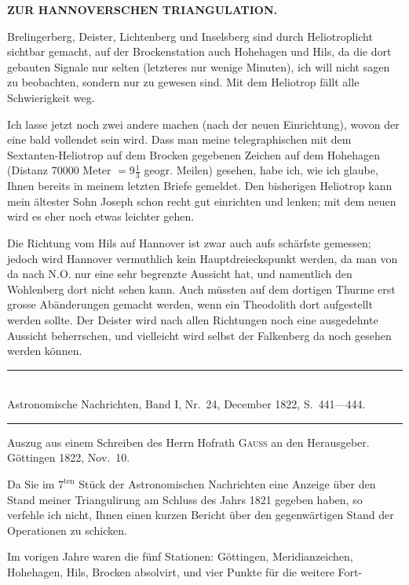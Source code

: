 \par\clearpage
\noindent\null\hfill{\small\textbf{ZUR HANNOVERSCHEN TRIANGULATION.}}\hfill{}\par\medskip
\par\noindent\hspace*{\parindent}Brelingerberg, Deister, Lichtenberg und Inselsberg sind durch Heliotroplicht sichtbar gemacht, auf der Brockenstation auch Hohehagen und Hils, da die dort gebauten Signale nur selten (letzteres nur wenige Minuten), ich will nicht sagen zu beobachten, sondern nur zu  gewesen sind. Mit dem Heliotrop fällt alle Schwierigkeit weg.
\par\noindent\hspace*{\parindent}Ich lasse jetzt noch zwei andere machen (nach der neuen Einrichtung), wovon der eine bald vollendet sein wird. Dass man meine telegraphischen mit dem Sextanten-Heliotrop auf dem Brocken gegebenen Zeichen auf dem Hohehagen (Distanz \(70000\) Meter \(=9\frac{1}{3}\) geogr. Meilen)  gesehen, habe ich, wie ich glaube, Ihnen bereits in meinem letzten Briefe gemeldet. Den bisherigen Heliotrop kann mein ältester Sohn Joseph schon recht gut einrichten und lenken; mit dem neuen wird es eher noch etwas leichter gehen.
\par\noindent\hspace*{\parindent}Die Richtung vom Hils auf Hannover ist zwar auch aufs schärfste gemessen; jedoch wird Hannover vermuthlich kein Hauptdreieckspunkt werden, da man von da nach N.O. nur eine sehr begrenzte Aussicht hat, und namentlich den Wohlenberg dort nicht sehen kann. Auch müssten auf dem dortigen Thurme erst grosse Abänderungen gemacht werden, wenn ein Theodolith dort aufgestellt werden sollte. Der Deister wird nach allen Richtungen noch eine ausgedehnte Aussicht beherrschen, und vielleicht wird selbst der Falkenberg da noch gesehen werden können.
\begin{center}
\rule{.74\linewidth}{.4pt}\\[-.5ex]
{\small Astronomische Nachrichten, Band I, Nr.~24, December 1822, S.~441---444.}\\[-.5ex]
\rule{.74\linewidth}{.4pt}\par\medskip
Auszug aus einem Schreiben des Herrn Hofrath \textsc{Gauss} an den Herausgeber.\\
Göttingen 1822, Nov.~10.
\end{center}
\par\noindent\hspace*{\parindent}Da Sie im \(7^{\text{ten}}\) Stück der Astronomischen Nachrichten eine Anzeige über den Stand meiner Triangulirung am Schluss des Jahrs 1821 gegeben haben, so verfehle ich nicht, Ihnen einen kurzen Bericht über den gegenwärtigen Stand der Operationen zu schicken.
\par\noindent\hspace*{\parindent}Im vorigen Jahre waren die fünf Stationen: Göttingen, Meridianzeichen, Hohehagen, Hils, Brocken absolvirt, und vier Punkte für die weitere Fort-

